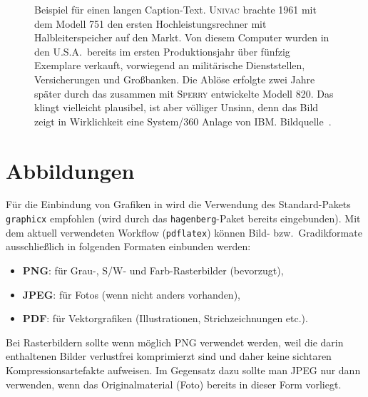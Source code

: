\begin{figure}
\centering
{}  %
\caption{Beispiel für einen langen Caption-Text. \textsc{Univac}
brachte 1961 mit dem Modell 751 den ersten Hochleistungsrechner
mit Halbleiterspeicher auf den Markt. Von diesem Computer wurden
in den U.S.A.\ bereits im ersten Produktionsjahr über fünfzig
Exemplare verkauft, vorwiegend an militärische Dienststellen,
Versicherungen und Großbanken. Die Ablöse erfolgte zwei Jahre
später durch das zusammen mit \textsc{Sperry} entwickelte Modell 820.
Das klingt vielleicht plausibel, ist aber völliger Unsinn, denn das
Bild zeigt in Wirklichkeit eine System/360 Anlage von IBM. 
Bildquelle~\cite{IBM360}.} 
\label{fig:ibm360}
\end{figure}





\section{Abbildungen}

Für die Einbindung von Grafiken in \latex wird die Verwendung des Stan\-dard-Pakets
\texttt{graphicx} \cite{Carlisle99} empfohlen 
(wird durch das \texttt{hagenberg}-Paket bereits eingebunden). 
Mit dem aktuell verwendeten Workflow (\texttt{pdflatex})
können Bild- bzw.\ Gradikformate ausschließlich 
in folgenden Formaten einbunden werden:
%
\begin{itemize}
	\item \textbf{PNG}: für Grau-, S/W- und Farb-Rasterbilder (bevorzugt),
	\item \textbf{JPEG}: für Fotos (wenn nicht anders vorhanden),
	\item \textbf{PDF}: für Vektorgrafiken (Illustrationen, Strichzeichnungen etc.).
\end{itemize}
%
Bei Rasterbildern sollte wenn möglich PNG verwendet werden, weil die darin 
enthaltenen Bilder verlustfrei komprimierzt sind und daher keine sichtaren Kompressionsartefakte
aufweisen. Im Gegensatz dazu sollte man JPEG nur dann verwenden, wenn das Originalmaterial
(Foto) bereits in dieser Form vorliegt.


